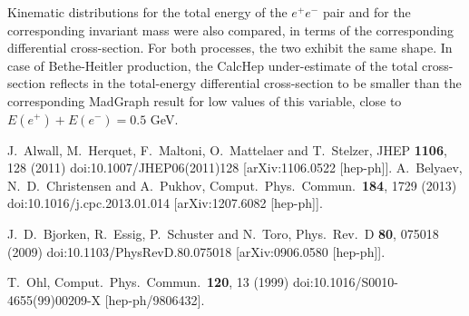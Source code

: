 \documentclass{article}
\begin{document}
Kinematic distributions for the total energy of the $e^+ e^-$ pair and for the corresponding invariant mass were also compared, in terms of the corresponding differential cross-section. For both processes, the two exhibit the same shape. In case of Bethe-Heitler production, the CalcHep under-estimate of the total cross-section reflects in the total-energy differential cross-section to be smaller than the corresponding MadGraph result for low values of this variable, close to $E(e^+)+E(e^-) = 0.5$ GeV.


 \begin{thebibliography}{1}

  J.~Alwall, M.~Herquet, F.~Maltoni, O.~Mattelaer and T.~Stelzer,
  JHEP {\bf 1106}, 128 (2011)
  doi:10.1007/JHEP06(2011)128
  [arXiv:1106.0522 [hep-ph]].
  A.~Belyaev, N.~D.~Christensen and A.~Pukhov,
  Comput.\ Phys.\ Commun.\  {\bf 184}, 1729 (2013)
  doi:10.1016/j.cpc.2013.01.014
  [arXiv:1207.6082 [hep-ph]].

  J.~D.~Bjorken, R.~Essig, P.~Schuster and N.~Toro,
  Phys.\ Rev.\ D {\bf 80}, 075018 (2009)
  doi:10.1103/PhysRevD.80.075018
  [arXiv:0906.0580 [hep-ph]].


  T.~Ohl,
  Comput.\ Phys.\ Commun.\  {\bf 120}, 13 (1999)
  doi:10.1016/S0010-4655(99)00209-X
  [hep-ph/9806432].


  \end{thebibliography}
\end{document}
